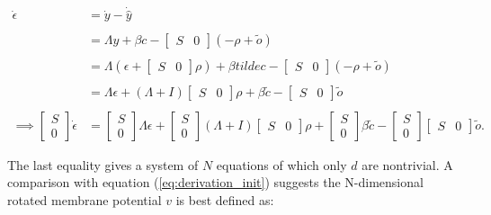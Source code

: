 \begin{enumerate}
\begin{align*}
\dot{\epsilon}
&=
\dot{y} - \dot{\hat{y}}
\\
\\
&= 
\Lambda y + \beta c - 
\begin{bmatrix}
S & 0
\end{bmatrix}
\left(
-\rho + \tilde{o}
\right)
\\
\\
&= 
\Lambda \left(
\epsilon + 
\begin{bmatrix}
S & 0
\end{bmatrix}
\rho
\right)
+ 
\beta tilde{c}
-
\begin{bmatrix}
S & 0
\end{bmatrix}
\left(
-\rho + \tilde{o}
\right)
\\
\\
&= 
\Lambda \epsilon
+
\left( 
\Lambda + I
\right)
\begin{bmatrix}
S & 0
\end{bmatrix}
\rho
+ 
\beta \tilde{c}
-
\begin{bmatrix}
S & 0
\end{bmatrix}
\tilde{o}
\\
\\
\implies
\begin{bmatrix}
S \\ 0
\end{bmatrix}
\dot{\epsilon}
&= 
\begin{bmatrix}
S \\ 0
\end{bmatrix}
\Lambda \epsilon
+
\begin{bmatrix}
S \\ 0
\end{bmatrix}
\left( 
\Lambda + I
\right)
\begin{bmatrix}
S & 0
\end{bmatrix}
\rho
+
\begin{bmatrix}
S \\ 0
\end{bmatrix}
\beta
\tilde{c}
-
\begin{bmatrix}
S \\ 0
\end{bmatrix}
\begin{bmatrix}
S & 0
\end{bmatrix}
\tilde{o}.
\end{align*}

The last equality gives a system of $N$ equations of which only $d$ are nontrivial. A comparison with equation (\ref{eq:derivation_init}) suggests the N-dimensional rotated membrane potential $v$ is best defined as:


\end{enumerate}
